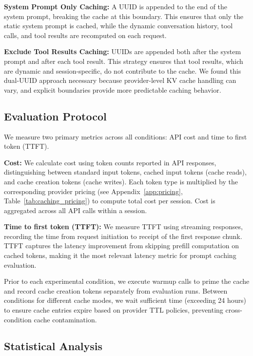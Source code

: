 \documentclass{article}
\theoremstyle{plain}
\theoremstyle{definition}
\theoremstyle{remark}
\begin{document}
\textbf{System Prompt Only Caching:} A UUID is appended to the end of the system prompt, breaking the cache at this boundary. This ensures that only the static system prompt is cached, while the dynamic conversation history, tool calls, and tool results are recomputed on each request.

\textbf{Exclude Tool Results Caching:} UUIDs are appended both after the system prompt and after each tool result. This strategy ensures that tool results, which are dynamic and session-specific, do not contribute to the cache. We found this dual-UUID approach necessary because provider-level KV cache handling can vary, and explicit boundaries provide more predictable caching behavior.

\subsection{Evaluation Protocol}
\label{subsec:evaluation_protocol}

We measure two primary metrics across all conditions: API cost and time to first token (TTFT).

\textbf{Cost:} We calculate cost using token counts reported in API responses, distinguishing between standard input tokens, cached input tokens (cache reads), and cache creation tokens (cache writes). Each token type is multiplied by the corresponding provider pricing (see Appendix~\ref{app:pricing}, Table~\ref{tab:caching_pricing}) to compute total cost per session. Cost is aggregated across all API calls within a session.

\textbf{Time to first token (TTFT):} We measure TTFT using streaming responses, recording the time from request initiation to receipt of the first response chunk. TTFT captures the latency improvement from skipping prefill computation on cached tokens, making it the most relevant latency metric for prompt caching evaluation.

Prior to each experimental condition, we execute warmup calls to prime the cache and record cache creation tokens separately from evaluation runs. Between conditions for different cache modes, we wait sufficient time (exceeding 24 hours) to ensure cache entries expire based on provider TTL policies, preventing cross-condition cache contamination.

\subsection{Statistical Analysis}
\label{subsec:statistical_analysis}
\end{document}
